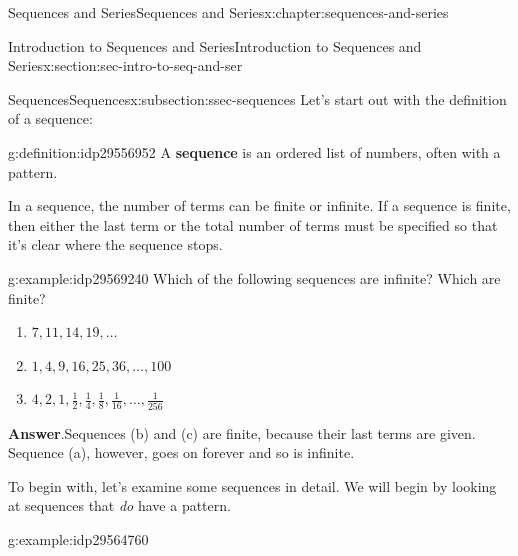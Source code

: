 \documentclass[twoside,10pt,]{book}
\newcommand{\blocktitlefont}{\relax}
\newcommand{\terminology}[1]{\textbf{#1}}
\numberwithin{equation}{section}
\begin{document}
%
%
\typeout{************************************************}
\typeout{************************************************}
%
\begin{chapterptx}{Sequences and Series}{}{Sequences and Series}{}{}{x:chapter:sequences-and-series}
%
%
\typeout{************************************************}
\typeout{************************************************}
%
\begin{sectionptx}{Introduction to Sequences and Series}{}{Introduction to Sequences and Series}{}{}{x:section:sec-intro-to-seq-and-ser}
%
%
\typeout{************************************************}
\typeout{************************************************}
%
\begin{subsectionptx}{Sequences}{}{Sequences}{}{}{x:subsection:ssec-sequences}
Let's start out with the definition of a sequence: \begin{definition}{}{g:definition:idp29556952}%
A \terminology{sequence} is an ordered list of numbers, often with a pattern.%
\end{definition}
 In a sequence, the number of terms can be finite or infinite.  If a sequence is finite, then either the last term or the total number of terms must be specified so that it's clear where the sequence stops. \begin{example}{}{g:example:idp29569240}%
Which of the following sequences are infinite?  Which are finite? %
\begin{enumerate}[label=(\alph*)]
\item{}\(\displaystyle 7,11,14,19,\ldots\)%
\item{}\(\displaystyle 1,4,9,16,25,36,\ldots,100\)%
\item{}\(\displaystyle 4,2,1,\tfrac{1}{2},\tfrac{1}{4},\tfrac{1}{8},\tfrac{1}{16},\ldots,\tfrac{1}{256}\)%
\end{enumerate}
\par\smallskip%
\noindent\textbf{\blocktitlefont Answer}.\label{g:answer:idp29569112}{}\hypertarget{g:answer:idp29569112}{}\quad{}Sequences (b) and (c) are finite, because their last terms are given.  Sequence (a), however, goes on forever and so is infinite.\end{example}
%
\par
To begin with, let's examine some sequences in detail.  We will begin by looking at sequences that \emph{do} have a pattern. \begin{example}{}{g:example:idp29564760}%

\end{example}
\end{subsectionptx}
\end{sectionptx}
\end{chapterptx}
\end{document}
